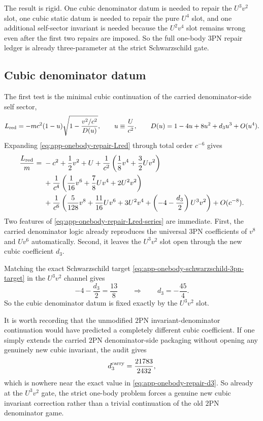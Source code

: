 \documentclass[11pt]{article}
\begin{document}
The result is rigid.  One cubic denominator datum is needed to repair the
$U^3v^2$ slot, one cubic static datum is needed to repair the pure $U^4$ slot,
and one additional self-sector invariant is needed because the $U^2v^4$ slot
remains wrong even after the first two repairs are imposed.  So the full
one-body $3$PN repair ledger is already three-parameter at the strict
Schwarzschild gate.

\subsection{Cubic denominator datum}
\label{app:onebody-repair-denominator}

The first test is the minimal cubic continuation of the carried denominator-side
self sector,
\begin{equation}
L_{\rm red}
=-mc^2(1-u)\sqrt{1-\frac{v^2/c^2}{D(u)}},
\qquad
u\equiv\frac{U}{c^2},
\qquad
D(u)=1-4u+8u^2+d_3u^3+O(u^4).
\label{eq:app-onebody-repair-Lred}
\end{equation}
Expanding \eqref{eq:app-onebody-repair-Lred} through total order $c^{-6}$
gives
\begin{align}
\frac{L_{\rm red}}{m}
={}&-c^2+\frac12v^2+U
+\frac{1}{c^2}\left(\frac18v^4+\frac32Uv^2\right)
\nonumber\\
&
+\frac{1}{c^4}\left(\frac1{16}v^6+\frac78Uv^4+2U^2v^2\right)
\nonumber\\
&
+\frac{1}{c^6}\left(
\frac5{128}v^8
+\frac{11}{16}Uv^6
+3U^2v^4
+\left(-4-\frac{d_3}{2}\right)U^3v^2
\right)
+O(c^{-8}).
\label{eq:app-onebody-repair-Lred-series}
\end{align}
Two features of \eqref{eq:app-onebody-repair-Lred-series} are immediate.
First, the carried denominator logic already reproduces the universal $3$PN
coefficients of $v^8$ and $Uv^6$ automatically.  Second, it leaves the
$U^3v^2$ slot open through the new cubic coefficient $d_3$.

Matching the exact Schwarzschild target
\eqref{eq:app-onebody-schwarzschild-3pn-target} in the $U^3v^2$ channel gives
\begin{equation}
-4-\frac{d_3}{2}=\frac{13}{8}
\qquad\Longrightarrow\qquad
\boxed{d_3=-\frac{45}{4}.}
\label{eq:app-onebody-repair-d3}
\end{equation}
So the cubic denominator datum is fixed exactly by the $U^3v^2$ slot.

It is worth recording that the unmodified $2$PN invariant-denominator
continuation would have predicted a completely different cubic coefficient.  If
one simply extends the carried $2$PN denominator-side packaging without opening
any genuinely new cubic invariant, the audit gives
\begin{equation}
d_3^{\rm carry}=\frac{21783}{2432},
\label{eq:app-onebody-repair-d3-carry}
\end{equation}
which is nowhere near the exact value in
\eqref{eq:app-onebody-repair-d3}.  So already at the $U^3v^2$ gate, the strict
one-body problem forces a genuine new cubic invariant correction rather than a
trivial continuation of the old $2$PN denominator game.
\end{document}
